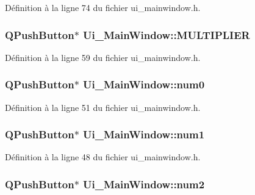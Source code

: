 \-Définition à la ligne 74 du fichier ui\-\_\-mainwindow.\-h.

\hypertarget{class_ui___main_window_a0093863cdee1f0a9f32f80a145eb9d74}{
\subsubsection[{\-M\-U\-L\-T\-I\-P\-L\-I\-E\-R}]{\setlength{\rightskip}{0pt plus 5cm}\-Q\-Push\-Button$\ast$ {\bf \-Ui\-\_\-\-Main\-Window\-::\-M\-U\-L\-T\-I\-P\-L\-I\-E\-R}}}\label{class_ui___main_window_a0093863cdee1f0a9f32f80a145eb9d74}


\-Définition à la ligne 59 du fichier ui\-\_\-mainwindow.\-h.

\hypertarget{class_ui___main_window_ad451216d14bbfb46a45e691f81bd5697}{
\subsubsection[{num0}]{\setlength{\rightskip}{0pt plus 5cm}\-Q\-Push\-Button$\ast$ {\bf \-Ui\-\_\-\-Main\-Window\-::num0}}}\label{class_ui___main_window_ad451216d14bbfb46a45e691f81bd5697}


\-Définition à la ligne 51 du fichier ui\-\_\-mainwindow.\-h.

\hypertarget{class_ui___main_window_a06046b98ba8522d7866ff59b214208d4}{
\subsubsection[{num1}]{\setlength{\rightskip}{0pt plus 5cm}\-Q\-Push\-Button$\ast$ {\bf \-Ui\-\_\-\-Main\-Window\-::num1}}}\label{class_ui___main_window_a06046b98ba8522d7866ff59b214208d4}


\-Définition à la ligne 48 du fichier ui\-\_\-mainwindow.\-h.

\hypertarget{class_ui___main_window_a42840810d6ba204b30a10316437fbac8}{
\subsubsection[{num2}]{\setlength{\rightskip}{0pt plus 5cm}\-Q\-Push\-Button$\ast$ {\bf \-Ui\-\_\-\-Main\-Window\-::num2}}}\label{class_ui___main_window_a42840810d6ba204b30a10316437fbac8}


